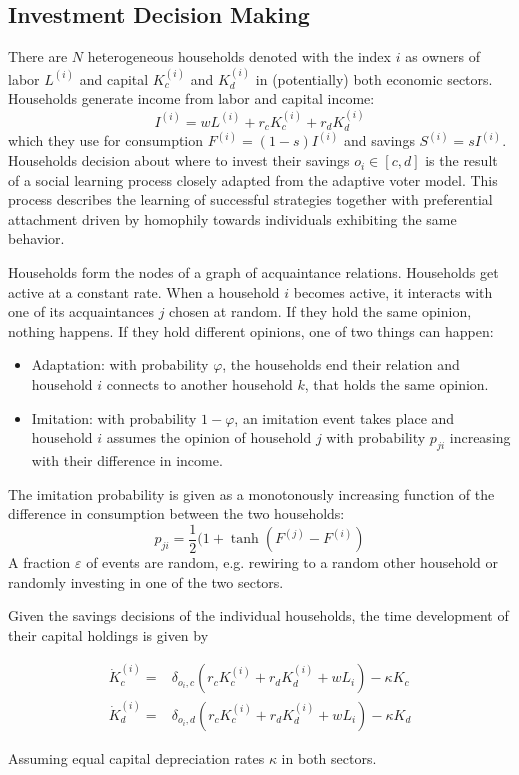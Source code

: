 \subsection{Investment Decision Making}

There are $N$ heterogeneous households denoted with the index $i$ as owners of labor $L^{(i)}$ and capital $K_c^{(i)}$ and $K_d^{(i)}$ in (potentially) both economic sectors.
Households generate income from labor and capital income:
\begin{equation}
	I^{(i)} = w L^{(i)} + r_c K_c^{(i)} + r_d K_d^{(i)}
	\label{household_income}
\end{equation}
which they use for consumption $F^{(i)} = (1-s) I^{(i)}$ and savings $S^{(i)} = s I^{(i)}$. Households decision about where to invest their savings $o_i \in [c,d]$ is the result of a social learning process closely adapted from the adaptive voter model. This process describes the learning of successful strategies together with preferential attachment driven by homophily towards individuals exhibiting the same behavior.

Households form the nodes of a graph of acquaintance relations. Households get active at a constant rate. When a household $i$ becomes active, it interacts with one of its acquaintances $j$ chosen at random. If they hold the same opinion, nothing happens. If they hold different opinions, one of two things can happen:
\begin{itemize}
	\item Adaptation: with probability $\varphi$, the households end their relation and household $i$ connects to another household $k$, that holds the same opinion. 
	\item Imitation: with probability $1-\varphi$, an imitation event takes place and household $i$ assumes the opinion of household $j$ with probability $p_{ji}$ increasing with their difference in income.
\end{itemize}
The imitation probability is given as a monotonously increasing function of the difference in consumption between the two households:
\begin{equation}
	p_{ji} = \frac{1}{2}(1 + \tanh \left( F^{(j)} - F^{(i)}  \right)
	\label{eq:imitation_probability}
\end{equation}
A fraction $\varepsilon$ of events are random, e.g. rewiring to a random other household or randomly investing in one of the two sectors.

Given the savings decisions of the individual households, the time development of their capital holdings is given by

\begin{align}
	\dot{K}_c^{(i)} =& \delta_{o_i, c} \left( r_c K_c^{(i)} + r_d K_d^{(i)} + w L_i \right) - \kappa K_c \\
	\dot{K}_d^{(i)} =& \delta_{o_i, d} \left( r_c K_c^{(i)} + r_d K_d^{(i)} + w L_i \right) - \kappa K_d 
\end{align}

Assuming equal capital depreciation rates $\kappa$ in both sectors.
